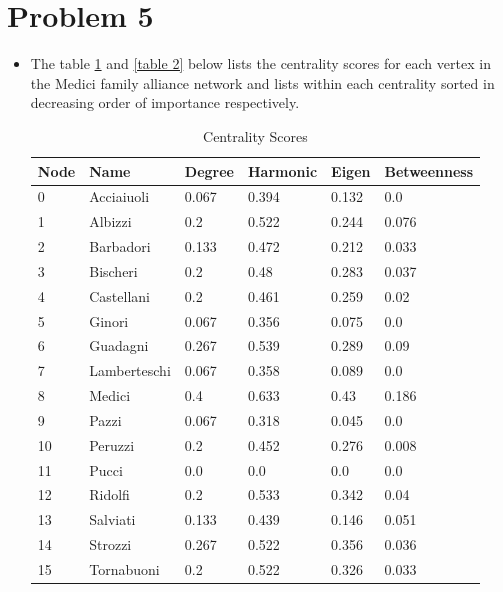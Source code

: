 \documentclass{article}
\begin{document}
\section*{Problem 5}
\begin{itemize}
\item
The table \ref{table 1} and \ref{table 2} below lists the centrality scores for each vertex in the Medici family alliance network and lists within each centrality sorted in decreasing order of importance respectively.
\begin{table}[H]
\centering
\caption{Centrality Scores}
\label{table 1}
\begin{tabular}{|l|l|l|l|l|l|}
\hline
Node & Name         & Degree & Harmonic & Eigen & Betweenness \\
\hline
0    & Acciaiuoli   & 0.067  & 0.394    & 0.132 & 0.0         \\
1    & Albizzi      & 0.2    & 0.522    & 0.244 & 0.076       \\
2    & Barbadori    & 0.133  & 0.472    & 0.212 & 0.033       \\
3    & Bischeri     & 0.2    & 0.48     & 0.283 & 0.037       \\
4    & Castellani   & 0.2    & 0.461    & 0.259 & 0.02        \\
5    & Ginori       & 0.067  & 0.356    & 0.075 & 0.0         \\
6    & Guadagni     & 0.267  & 0.539    & 0.289 & 0.09        \\
7    & Lamberteschi & 0.067  & 0.358    & 0.089 & 0.0         \\
8    & Medici       & 0.4    & 0.633    & 0.43  & 0.186       \\
9    & Pazzi        & 0.067  & 0.318    & 0.045 & 0.0         \\
10   & Peruzzi      & 0.2    & 0.452    & 0.276 & 0.008       \\
11   & Pucci        & 0.0    & 0.0      & 0.0   & 0.0         \\
12   & Ridolfi      & 0.2    & 0.533    & 0.342 & 0.04        \\
13   & Salviati     & 0.133  & 0.439    & 0.146 & 0.051       \\
14   & Strozzi      & 0.267  & 0.522    & 0.356 & 0.036       \\
15   & Tornabuoni   & 0.2    & 0.522    & 0.326 & 0.033       \\
\hline    
\end{tabular}
\end{table}

\end{itemize}
\end{document}
